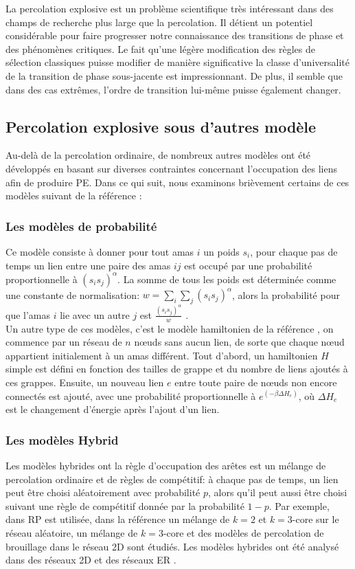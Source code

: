 La percolation explosive est un problème scientifique très intéressant dans des champs de recherche plus large que la percolation. Il détient un potentiel considérable pour faire progresser notre connaissance des transitions de phase et des phénomènes critiques. Le fait qu'une légère modification des règles de sélection classiques puisse modifier de manière significative la classe d'universalité de la transition de phase sous-jacente est impressionnant. De plus, il semble que dans des cas extrêmes, l'ordre de transition lui-même puisse également changer.

\subsection{Percolation explosive sous d'autres modèle}
Au-delà de la percolation ordinaire, de nombreux autres modèles ont été développés en basant sur diverses contraintes concernant l'occupation des liens afin de produire PE. Dans ce qui suit, nous examinons brièvement certains de ces modèles suivant de la référence \cite{Boccaletti-al2016}: 
\subsubsection{Les modèles de probabilité}
Ce modèle consiste à donner pour tout amas $i$ un poids $s_i$, pour chaque pas de temps un lien entre une paire des amas $ij$ est occupé par une probabilité proportionnelle à $(s_is_j)^{\alpha}$. La somme  de tous les poids est déterminée comme une constante de normalisation: $w=\sum_i\sum_j(s_is_j)^{\alpha}$, alors la probabilité pour que l'amas $i$ lie avec un autre $j$ est $\frac{(s_is_j)^{\alpha}}{w}$ \cite{Cho-al2010}.\\ Un autre type de ces modèles, c'est le modèle hamiltonien de la référence \cite{Moreira-al2010}, on commence par un réseau de $n$ nœuds sans aucun lien, de sorte que chaque nœud appartient initialement à un amas différent. Tout d'abord, un hamiltonien $H$ simple est défini en fonction des tailles de grappe et du nombre de liens ajoutés à ces grappes. Ensuite, un nouveau lien $e$ entre toute paire de nœuds non encore connectés est ajouté, avec une probabilité proportionnelle à $e^{(-\beta\Delta H_e)}$, où $\Delta H_e$ est le changement d'énergie après l'ajout d'un lien.

\subsubsection{Les modèles Hybrid}
Les modèles hybrides ont la règle d'occupation des arêtes est un mélange de percolation ordinaire et de règles de compétitif: à chaque pas de temps, un lien peut être choisi aléatoirement avec probabilité $p$, alors qu'il peut aussi être choisi suivant une règle de compétitif donnée par la probabilité $1-p$. Par exemple, dans \cite{Bastas-al2014} RP est utilisée, dans la référence \cite{Cao-Schwarz2012} un mélange de $k=2$ et $k=3$-core sur le réseau aléatoire, un mélange de $k=3$-core et des modèles de percolation de brouillage dans le réseau 2D sont étudiés. Les modèles hybrides ont été analysé dans des réseaux 2D \cite{Cao-Schwarz2012,Bastas-al2014} et des réseaux ER  \cite{Cao-Schwarz2012,Bastas-al2014,Fan-al2012}.
